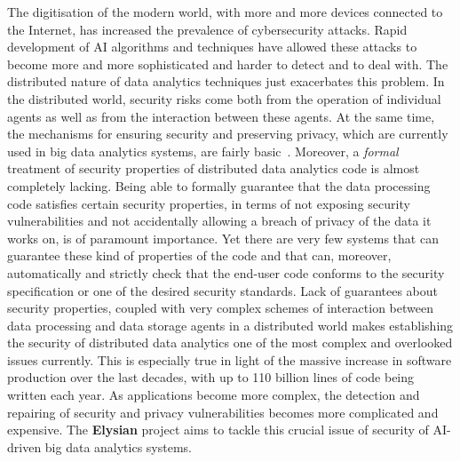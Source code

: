\documentclass[a4paper,11pt]{article}
\newcommand{\project}[1]{\textbf{#1}\xspace}
\newcommand{\SECURITY}{\project{Elysian}}
\newcommand{\TheProject}{\SECURITY}
\begin{document}
The digitisation of the modern world, with more and more devices connected to the Internet, has increased the prevalence of cybersecurity attacks. Rapid development of AI algorithms and techniques have allowed these attacks to become more and more sophisticated and harder to detect and to deal with. The distributed nature of data analytics techniques just exacerbates this problem. In the distributed world, security risks come both from the operation of individual agents as well as from the interaction between these agents. At the same time, the mechanisms for ensuring security and preserving privacy, which are currently used in big data analytics systems, are fairly basic~\cite{basicSecurityBigData}. Moreover, a \emph{formal} treatment of security properties of distributed data analytics code is almost completely lacking. Being able to formally guarantee that the data processing code satisfies certain security properties, in terms of not exposing security vulnerabilities and not accidentally allowing a breach of privacy of the data it works on, is of paramount importance. Yet there are very few systems that can guarantee these kind of properties of the code and that can, moreover, automatically and strictly check that the end-user code conforms to the security specification or one of the desired security standards. Lack of guarantees about security properties, coupled with very complex schemes of interaction between data processing and data storage agents in a distributed world makes establishing the security of distributed data analytics one of the most complex and overlooked issues currently. This is especially true in light of the massive increase in software production over the last decades, with up to 110 billion lines of code being written each year. As applications become more complex, the detection and repairing of security and privacy vulnerabilities becomes more complicated and expensive. The \TheProject{} project aims to tackle this crucial issue of security of AI-driven big data analytics systems.
\end{document}
